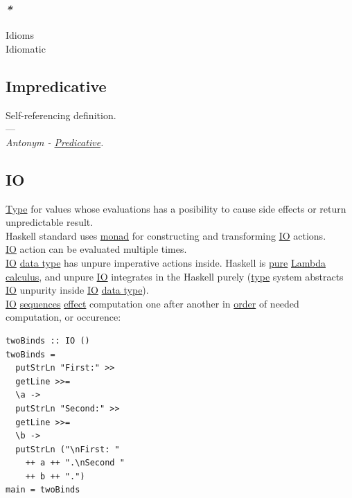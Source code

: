 \documentclass[11pt]{article}
\begin{document}
\subsubsection{\emph{*}}
\label{sec:org272d6ab}

\label{org7c4e86b}Idioms\\
\label{org8bbf972}Idiomatic\\

\subsection{\label{orgb8e2e94}Impredicative}
\label{sec:org0707f84}
Self-referencing definition.\\

---\\

\emph{Antonym - \hyperref[org488427a]{Predicative}.}\\

\subsection{\label{org79ee7d8}IO}
\label{sec:orgfd2d8a8}
\hyperref[org4fbaeb8]{Type} for values whose evaluations has a posibility to cause side effects or return unpredictable result.\\
Haskell standard uses \hyperref[org268aaf1]{monad} for constructing and transforming \hyperref[org79ee7d8]{IO} actions.\\
\hyperref[org79ee7d8]{IO} action can be evaluated multiple times.\\

\hyperref[org79ee7d8]{IO} \hyperref[org965cde3]{data type} has unpure imperative actions inside. Haskell is \hyperref[org08c21de]{pure} \hyperref[org617da6f]{Lambda calculus}, and unpure \hyperref[org79ee7d8]{IO} integrates in the Haskell purely (\hyperref[org4fbaeb8]{type} system abstracts \hyperref[org79ee7d8]{IO} unpurity inside \hyperref[org79ee7d8]{IO} \hyperref[org965cde3]{data type}).\\

\hyperref[org79ee7d8]{IO} \hyperref[orgf15dce2]{sequences} \hyperref[org9502b33]{effect} computation one after another in \hyperref[org8544276]{order} of needed computation, or occurence:\\

\begin{verbatim}
twoBinds :: IO ()
twoBinds =
  putStrLn "First:" >>
  getLine >>=
  \a ->
  putStrLn "Second:" >>
  getLine >>=
  \b ->
  putStrLn ("\nFirst: "
    ++ a ++ ".\nSecond "
    ++ b ++ ".")
main = twoBinds
\end{verbatim}
\end{document}

